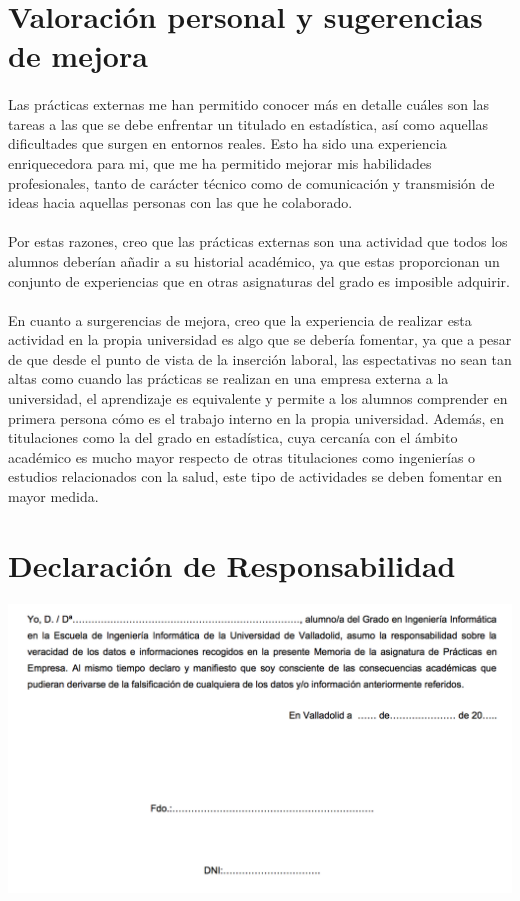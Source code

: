 \documentclass[11pt,a4paper,spanish]{article}
\begin{document}
  \section{Valoración personal y sugerencias de mejora}

    \paragraph{}
    Las prácticas externas me han permitido conocer más en detalle cuáles son las tareas a las que se debe enfrentar un titulado en estadística, así como aquellas dificultades que surgen en entornos reales. Esto ha sido una experiencia enriquecedora para mi, que me ha permitido mejorar mis habilidades profesionales, tanto de carácter técnico como de comunicación y transmisión de ideas hacia aquellas personas con las que he colaborado.

    \paragraph{}
    Por estas razones, creo que las prácticas externas son una actividad que todos los alumnos deberían añadir a su historial académico, ya que estas proporcionan un conjunto de experiencias que en otras asignaturas del grado es imposible adquirir.

    \paragraph{}
    En cuanto a surgerencias de mejora, creo que la experiencia de realizar esta actividad en la propia universidad es algo que se debería fomentar, ya que a pesar de que desde el punto de vista de la inserción laboral, las espectativas no sean tan altas como cuando las prácticas se realizan en una empresa externa a la universidad, el aprendizaje es equivalente y permite a los alumnos comprender en primera persona cómo es el trabajo interno en la propia universidad. Además, en titulaciones como la del grado en estadística, cuya cercanía con el ámbito académico es mucho mayor respecto de otras titulaciones como ingenierías o estudios relacionados con la  salud, este tipo de actividades se deben fomentar en mayor medida.

  \newpage
   \section{Declaración de Responsabilidad}

       \includegraphics[width=\textwidth]{responsibility-declaration}
\end{document}

